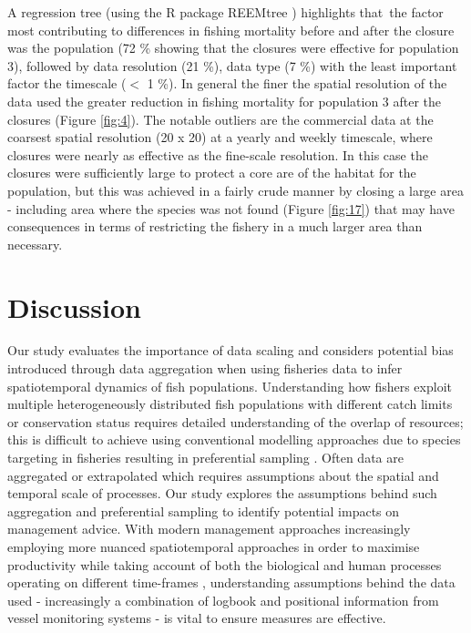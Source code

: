 \documentclass[review]{elsarticle}
\begin{document}
A regression tree (using the R package REEMtree \citep{Sela2012}) highlights
that the factor most contributing to differences in fishing mortality before
and after the closure was the population (72 \% showing that the closures were
effective for population 3), followed by data resolution (21 \%), data type (7
\%) with the least important factor the timescale ($<$ 1 \%). In general the
finer the spatial resolution of the data used the greater reduction in fishing
mortality for population 3 after the closures (Figure \ref{fig:4}). The notable
outliers are the commercial data at the coarsest spatial resolution (20 x 20)
at a yearly and weekly timescale, where closures were nearly as effective as
the fine-scale resolution. In this case the closures were sufficiently large to
protect a core are of the habitat for the population, but this was achieved in
a fairly crude manner by closing a large area - including area where the
species was not found (Figure \ref{fig:17}) that may have consequences in
terms of restricting the fishery in a much larger area than necessary. \\

\section{Discussion}

Our study evaluates the importance of data scaling and considers potential bias
introduced through data aggregation when using fisheries data to infer
spatiotemporal dynamics of fish populations. Understanding how fishers exploit
multiple heterogeneously distributed fish populations with different catch
limits or conservation status requires detailed understanding of the overlap of
resources; this is difficult to achieve using conventional modelling approaches
due to species targeting in fisheries resulting in preferential sampling
\citep{Martinez-Minaya2018}. Often data are aggregated or extrapolated which
requires assumptions about the spatial and temporal scale of processes. Our
study explores the assumptions behind such aggregation and preferential
sampling to identify potential impacts on management advice. With modern
management approaches increasingly employing more nuanced spatiotemporal
approaches in order to maximise productivity while taking account of both the
biological and human processes operating on different time-frames
\citep{Dunn2016}, understanding assumptions behind the data used - increasingly
a combination of logbook and positional information from vessel monitoring
systems - is vital to ensure measures are effective. \\
\end{document}
